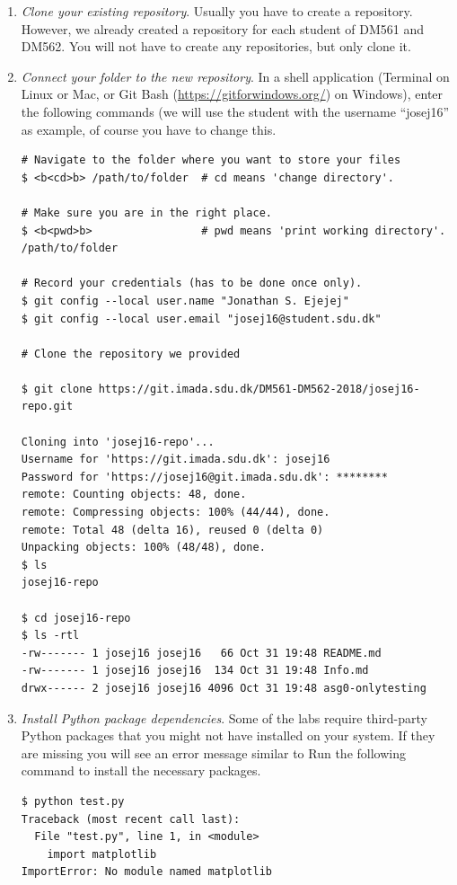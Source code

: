 \begin{enumerate}

\item \emph{Clone your existing repository}.
  Usually you have to create a repository. However, we already created a repository for each student of DM561 and DM562. You will not have to create any repositories, but only clone it.
  
\item \emph{Connect your folder to the new repository}.
\label{step:connect-folder}
In a shell application (Terminal on Linux or Mac, or Git Bash (\url{https://gitforwindows.org/}) on Windows), enter the following commands (we will use the student with the username ``josej16'' as example, of course you have to change this.

\begin{lstlisting}
# Navigate to the folder where you want to store your files
$ <b<cd>b> /path/to/folder  # cd means 'change directory'.

# Make sure you are in the right place.
$ <b<pwd>b>                 # pwd means 'print working directory'.
/path/to/folder

# Record your credentials (has to be done once only).
$ git config --local user.name "Jonathan S. Ejejej"
$ git config --local user.email "josej16@student.sdu.dk"

# Clone the repository we provided

$ git clone https://git.imada.sdu.dk/DM561-DM562-2018/josej16-repo.git

Cloning into 'josej16-repo'...
Username for 'https://git.imada.sdu.dk': josej16
Password for 'https://josej16@git.imada.sdu.dk': ********
remote: Counting objects: 48, done.
remote: Compressing objects: 100% (44/44), done.
remote: Total 48 (delta 16), reused 0 (delta 0)
Unpacking objects: 100% (48/48), done.
$ ls 
josej16-repo

$ cd josej16-repo
$ ls -rtl
-rw------- 1 josej16 josej16   66 Oct 31 19:48 README.md
-rw------- 1 josej16 josej16  134 Oct 31 19:48 Info.md
drwx------ 2 josej16 josej16 4096 Oct 31 19:48 asg0-onlytesting
\end{lstlisting}


\item \emph{Install Python package dependencies}.
\label{step:install-dependencies}
Some of the labs require third-party Python packages that you might not have installed on your system. If they are missing you will see an error message similar to 
Run the following command to install the necessary packages.
\begin{lstlisting}
$ python test.py 
Traceback (most recent call last):
  File "test.py", line 1, in <module>
    import matplotlib
ImportError: No module named matplotlib
\end{lstlisting}


\end{enumerate}
